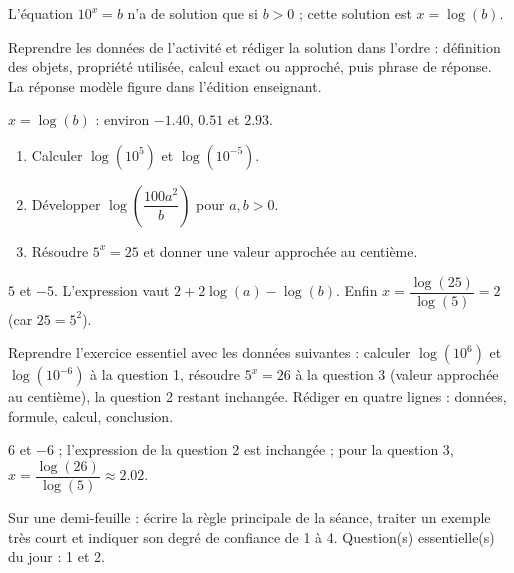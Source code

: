 \begin{summary}L'équation $10^x=b$ n'a de solution que si $b>0$ ; cette solution est $x=\log(b)$.\end{summary}

\begin{example}
Reprendre les données de l'activité et rédiger la solution dans l'ordre : définition des objets, propriété utilisée, calcul exact ou approché, puis phrase de réponse. La réponse modèle figure dans l'édition enseignant.
\end{example}
\begin{solution}$x=\log(b)$ : environ $-\num{1,40}$, $\num{0,51}$ et $\num{2,93}$.\end{solution}

\begin{exercise}[essentiel]
\begin{enumerate}\item Calculer $\log(10^5)$ et $\log(10^{-5})$.\item Développer $\log\!\left(\dfrac{100a^2}{b}\right)$ pour $a,b>0$.\item Résoudre $5^x=25$ et donner une valeur approchée au centième.\end{enumerate}
\end{exercise}
\begin{solution}$5$ et $-5$. L'expression vaut $2+2\log(a)-\log(b)$. Enfin $x=\dfrac{\log(25)}{\log(5)}=2$ (car $25=5^2$).\end{solution}


\begin{homework}Reprendre l'exercice essentiel avec les données suivantes : calculer $\log(10^{6})$ et $\log(10^{-6})$ à la question 1, résoudre $5^x=26$ à la question 3 (valeur approchée au centième), la question 2 restant inchangée. Rédiger en quatre lignes : données, formule, calcul, conclusion.\end{homework}
\begin{solution}$6$ et $-6$ ; l'expression de la question 2 est inchangée ; pour la question 3, $x=\dfrac{\log(26)}{\log(5)}\approx\num{2,02}$.\end{solution}

\begin{exitticket}[3 minutes]Sur une demi-feuille : écrire la règle principale de la séance, traiter un exemple très court et indiquer son degré de confiance de 1 à 4. Question(s) essentielle(s) du jour : 1 et 2.\end{exitticket}

